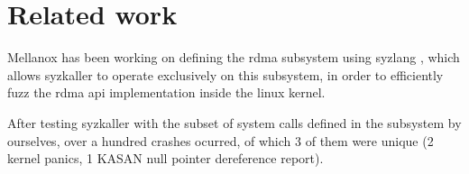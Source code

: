 \section{Related work}

Mellanox has been working on defining the rdma subsystem using syzlang \cite{lpc-2018},
which allows syzkaller to operate exclusively on this subsystem, in order to efficiently
fuzz the rdma api implementation inside the linux kernel. 

After testing syzkaller with the subset of system calls defined in the subsystem by ourselves, 
over a hundred crashes ocurred, of which 3 of them were unique (2 kernel panics, 1 KASAN null pointer
dereference report). 
